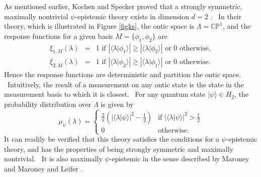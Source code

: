 \documentclass[letterpaper,11pt]{article}
\begin{document}
As mentioned earlier, Kochen and Specker proved that a strongly symmetric,
maximally nontrivial $\psi $-epistemic theory exists in dimension $d=2$ \cite%
{ks}. \ In their theory, which is illustrated in Figure \ref{figks}, the ontic space is $\Lambda =\mathbb{CP}^{1}$, and the
response functions for a given basis $M=\{\phi _{1},\phi _{2}\}$ are
\begin{eqnarray}
\xi _{1,M}(\lambda ) &=&1\text{ if }\left\vert  \langle \lambda |
\phi_1 \rangle \right\vert \geq \left\vert  \langle \lambda |
\phi_2 \rangle \right\vert \text{ or }0\text{ otherwise}, \\
\xi _{2,M}(\lambda ) &=&1\text{ if }\left\vert  \langle \lambda |
\phi_2 \rangle \right\vert \geq \left\vert  \langle \lambda |
\phi_1 \rangle \right\vert \text{ or }0\text{ otherwise}.
\end{eqnarray}%
Hence the response functions are deterministic and partition the ontic
space. \ Intuitively, the result of a measurement on any ontic state is
the state in the measurement basis to which it is closest. \ For any quantum
state $ | \psi \rangle \in H_{2}$, the probability distribution
over $\Lambda $ is given by
\begin{equation*}
\mu _{\psi }(\lambda )=%
\begin{cases}
\frac{2}{\pi }\left( | \langle \lambda | \psi \rangle |^{2}-\frac{1%
}{2}\right)  & \text{if }| \langle \lambda | \psi \rangle |^{2}>%
\frac{1}{2} \\
0 & \text{otherwise}.%
\end{cases}%
\end{equation*}%
It can readily be verified that this theory satisfies the conditions for a $\psi$-epistemic theory, and has the properties of being
strongly symmetric and maximally nontrivial. \ It is also maximally $\psi$-epistemic in the sense described by Maroney \cite{mar} and Maroney and Leifer \cite{marleif}. \
\end{document}
